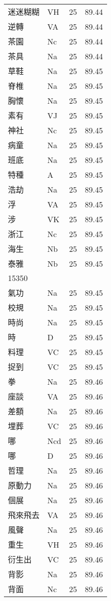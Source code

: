 \documentclass[twocolumn]{book}
\begin{document}
\begin{supertabular}{llrr}
迷迷糊糊 & VH & 25 &  89.44\\
逆轉 & VA & 25 &  89.44\\
茶園 & Nc & 25 &  89.44\\
茶具 & Na & 25 &  89.44\\
草鞋 & Na & 25 &  89.45\\
脊椎 & Na & 25 &  89.45\\
胸懷 & Na & 25 &  89.45\\
素有 & VJ & 25 &  89.45\\
神社 & Nc & 25 &  89.45\\
病童 & Na & 25 &  89.45\\
班底 & Na & 25 &  89.45\\
特種 & A & 25 &  89.45\\
浩劫 & Na & 25 &  89.45\\
浮 & VA & 25 &  89.45\\
涉 & VK & 25 &  89.45\\
浙江 & Nc & 25 &  89.45\\
海生 & Nb & 25 &  89.45\\
泰雅 & Nb & 25 &  89.45\\
15350\\
氣功 & Na & 25 &  89.45\\
校規 & Na & 25 &  89.45\\
時尚 & Na & 25 &  89.45\\
時 & D & 25 &  89.45\\
料理 & VC & 25 &  89.45\\
捉到 & VC & 25 &  89.45\\
拳 & Na & 25 &  89.46\\
座談 & VA & 25 &  89.46\\
差額 & Na & 25 &  89.46\\
埋葬 & VC & 25 &  89.46\\
哪 & Ncd & 25 &  89.46\\
哪 & D & 25 &  89.46\\
哲理 & Na & 25 &  89.46\\
原動力 & Na & 25 &  89.46\\
個展 & Na & 25 &  89.46\\
飛來飛去 & VA & 25 &  89.46\\
風聲 & Na & 25 &  89.46\\
重生 & VH & 25 &  89.46\\
衍生出 & VC & 25 &  89.46\\
背影 & Na & 25 &  89.46\\
背面 & Nc & 25 &  89.46\\

\end{supertabular}
\end{document}
